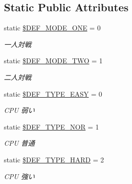 \subsection*{Static Public Attributes}
\begin{DoxyCompactItemize}
\item 
\mbox{\label{class_reversi_const_a3ae565ad68b714102079e94a675e2e79}} 
static \hyperlink{class_reversi_const_a3ae565ad68b714102079e94a675e2e79}{\$\+D\+E\+F\+\_\+\+M\+O\+D\+E\+\_\+\+O\+NE} = 0
\begin{DoxyCompactList}\small\item\em 一人対戦 \end{DoxyCompactList}\item 
\mbox{\label{class_reversi_const_ad6b4696b7c6a13ff0b2bf9971dbfce9e}} 
static \hyperlink{class_reversi_const_ad6b4696b7c6a13ff0b2bf9971dbfce9e}{\$\+D\+E\+F\+\_\+\+M\+O\+D\+E\+\_\+\+T\+WO} = 1
\begin{DoxyCompactList}\small\item\em 二人対戦 \end{DoxyCompactList}\item 
\mbox{\label{class_reversi_const_aa7c8b5c0a0cb3962fba2630bd31a3d27}} 
static \hyperlink{class_reversi_const_aa7c8b5c0a0cb3962fba2630bd31a3d27}{\$\+D\+E\+F\+\_\+\+T\+Y\+P\+E\+\_\+\+E\+A\+SY} = 0
\begin{DoxyCompactList}\small\item\em C\+PU 弱い \end{DoxyCompactList}\item 
\mbox{\label{class_reversi_const_aa41e16eea08a1ac1bee29417b96f56c8}} 
static \hyperlink{class_reversi_const_aa41e16eea08a1ac1bee29417b96f56c8}{\$\+D\+E\+F\+\_\+\+T\+Y\+P\+E\+\_\+\+N\+OR} = 1
\begin{DoxyCompactList}\small\item\em C\+PU 普通 \end{DoxyCompactList}\item 
\mbox{\label{class_reversi_const_a51a0e47e9e83936aa16a4b7eebdac02f}} 
static \hyperlink{class_reversi_const_a51a0e47e9e83936aa16a4b7eebdac02f}{\$\+D\+E\+F\+\_\+\+T\+Y\+P\+E\+\_\+\+H\+A\+RD} = 2
\begin{DoxyCompactList}\small\item\em C\+PU 強い \end{DoxyCompactList}\item 

\end{DoxyCompactItemize}
